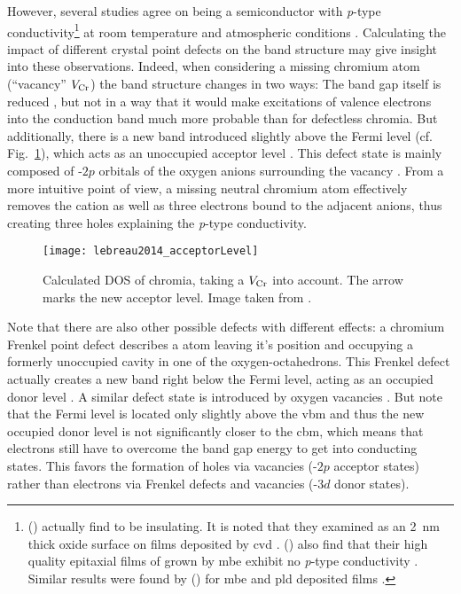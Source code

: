 However, several studies agree on  being a semiconductor with \textit{p}-type conductivity\footnote{
    \citeauthor{cheng2001a} (\citeyear{cheng2001a}) actually find  to be insulating. It is noted that they examined  as an \qty{2}{\nm} thick oxide surface on  films deposited by \gls{cvd} \cite{cheng2001a}.
    \citeauthor{farrell2015} (\citeyear{farrell2015}) also find that their high quality epitaxial films of  grown by \gls{mbe} exhibit no \textit{p}-type conductivity \cite{farrell2015}.
    Similar results were found by \citeauthor{kehoe2016} (\citeyear{kehoe2016}) for \gls{mbe} and \gls{pld} deposited films \cite{kehoe2016}.
}
at room temperature and atmospheric conditions
    \cite{kofstad1980,cheng1996,caricato2010,lebreau2014,mi2018,singh2019,polyakov2022a}.
Calculating the impact of different crystal point defects on the band structure may give insight into these observations.
Indeed, when considering a missing chromium atom (\enquote{vacancy} $V_{\ce{Cr}}$) the band structure changes in two ways:
The band gap itself is reduced \cite{mi2018}, but not in a way that it would make excitations of valence electrons into the conduction band much more probable than for defectless chromia.
But additionally, there is a new band introduced slightly above the Fermi level (cf. Fig.~\ref{Fig:lebreau2014_acceptorLevel}), which acts as an unoccupied acceptor level
    \cite{mi2018}.
This defect state is mainly composed of -$2p$ orbitals of the oxygen anions surrounding the vacancy
    \cite{lebreau2014}.
From a more intuitive point of view, a missing neutral chromium atom effectively removes the  cation as well as three electrons bound to the adjacent  anions, thus creating three holes \cite{lebreau2014} explaining the \textit{p}-type conductivity.
\begin{figure}
    \centering
    \texttt{[image: lebreau2014\_acceptorLevel]}
    \caption{Calculated \acrfull{DOS} of chromia, taking a $V_{\ce{Cr}}$ into account.
    The arrow marks the new acceptor level.
    Image taken from \cite{lebreau2014}.}
    \label{Fig:lebreau2014_acceptorLevel}
\end{figure}

Note that there are also other possible defects with different effects:
a chromium Frenkel point defect describes a  atom leaving it's position and occupying a formerly unoccupied cavity in one of the oxygen-octahedrons.
This Frenkel defect actually creates a new band right below the Fermi level, acting as an occupied donor level
    \cite{lebreau2014}.
A similar defect state is introduced by oxygen vacancies
    \cite{mi2018}.
But note that the Fermi level is located only slightly above the \gls{vbm} and thus the new occupied donor level is not significantly closer to the \gls{cbm}, which means that electrons still have to overcome the band gap energy to get into conducting states.
This favors the formation of holes via  vacancies (-$2p$ acceptor states) rather than electrons via  Frenkel defects and  vacancies (-$3d$ donor states).

